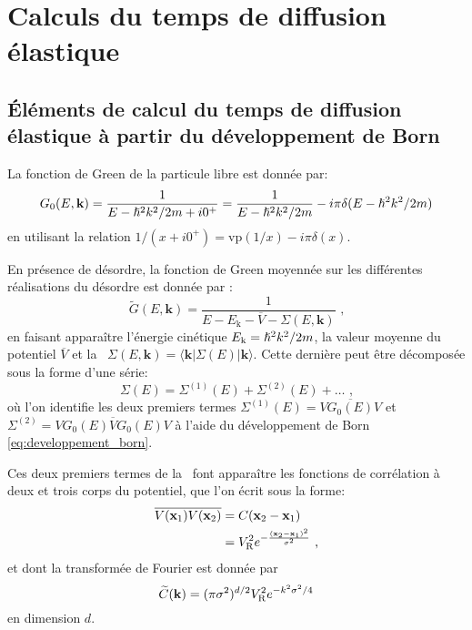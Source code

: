 \chapter{Calculs du temps de diffusion élastique}
\label{ch:anex_taus}

\section{Éléments de calcul du temps de diffusion élastique à partir du développement de Born}
La fonction de Green de la particule libre est donnée par:
\begin{equation}
G_0(E,\mathbf{k})=\frac{1}{E-\hslash^2k^2/2m+i0^+}=\frac{1}{E-\hslash^2k^2/2m}-i \pi \delta(E-\hslash^2k^2/2m)
\end{equation}
en utilisant la relation $ 1/(x+i0^+)=\mathrm{vp}(1/x)-i\pi \delta(x)$.

En présence de désordre, la fonction de Green moyennée sur les différentes réalisations du désordre est donnée par :
\begin{equation}
\widetilde{G}(E,\mathbf{k})=\frac{1}{E-E_{\mathrm{k}}-\overline{V}-\Sigma(E,\mathbf{k})} \text{ ,}
\end{equation}
en faisant apparaître l'énergie cinétique $E_{\mathrm{k}}=\hslash^2k^2/2m$, la valeur moyenne du potentiel $\overline{V}$ et la \selfenergy\ $\Sigma(E,\mathbf{k})=\langle\mathbf{k}|\Sigma(E)|\mathbf{k}\rangle$. Cette dernière peut être décomposée sous la forme d'une série:
\begin{equation}
\Sigma(E)=\Sigma^{(1)}(E) + \Sigma^{(2)}(E) + \dots \text{ ,}
\end{equation}
où l'on identifie les deux premiers termes $\Sigma^{(1)}(E)=\overline{V G_0(E) V}$ et $\Sigma^{(2)}=\overline{V G_0(E) V G_0(E) V}$ à l'aide du développement de Born \ref{eq:developpement_born}.

Ces deux premiers termes de la \selfenergy\ font apparaître les fonctions de corrélation à deux et trois corps du potentiel, que l'on écrit sous la forme:
\begin{align}
\overline{V(\mathbf{x}_{\mathrm{1}})V(\mathbf{x}_{\mathrm{2}})}&=C(\mathbf{x}_{\mathrm{2}}-\mathbf{x}_{\mathrm{1}}) \\
&=V_{\mathrm{R}}^2 e^{-\frac{(\mathbf{x}_{\mathrm{2}}-\mathbf{x}_{\mathrm{1}})^2}{\sigma^2}} \text{ ,}
\end{align}
et dont la transformée de Fourier est donnée par
\begin{equation}
\widetilde{C}(\mathbf{k})=(\pi\sigma^2)^{d/2}V_{\mathrm{R}}^2 e^{-k^2\sigma^2/4}
\end{equation}
en dimension $d$.

